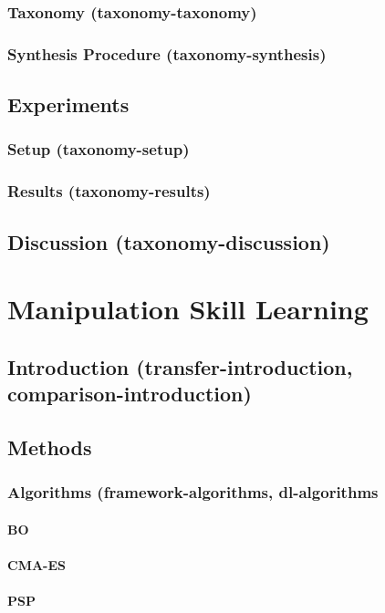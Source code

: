 \subsection{Taxonomy (taxonomy-taxonomy)}
\subsection{Synthesis Procedure (taxonomy-synthesis)}
\section{Experiments}
\subsection{Setup (taxonomy-setup)}
\subsection{Results (taxonomy-results)}
\section{Discussion (taxonomy-discussion)}

\chapter{Manipulation Skill Learning}
\section{Introduction (transfer-introduction, comparison-introduction)}
\section{Methods}
\subsection{Algorithms (framework-algorithms, dl-algorithms}
\subsubsection{BO}
\subsubsection{CMA-ES}
\subsubsection{PSP}
